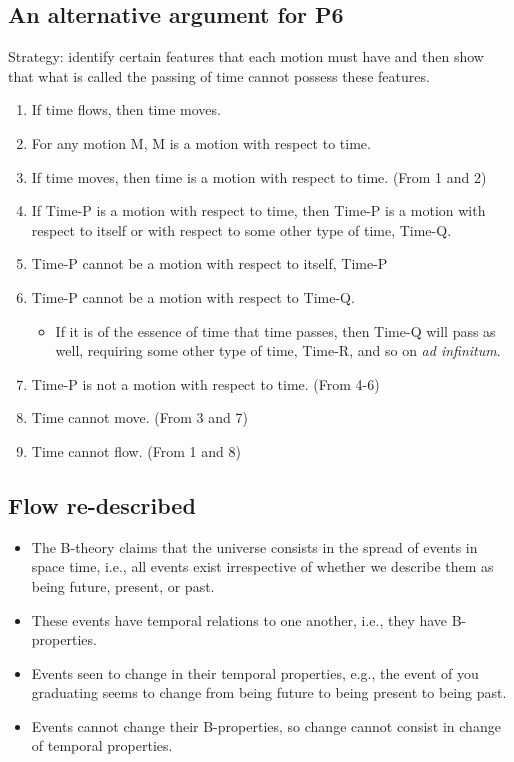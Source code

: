 \documentclass[oneside, 11]{article}
\begin{document}
\subsection*{An alternative argument for P6}

\noindent Strategy: identify certain features that each motion must have and then show that what is called the passing of time cannot possess these features. 

\begin{enumerate} 
\item If time flows, then time moves. 
\item For any motion M, M is a motion with respect to time.
\item If time moves, then time is a motion with respect to time. (From 1 and 2) 
\item If Time-P is a motion with respect to time, then Time-P is a motion with respect to itself or with respect to some other type of time, Time-Q.  
\item Time-P cannot be a motion with respect to itself, Time-P
\item Time-P cannot be a motion with respect to Time-Q. 
\begin{itemize}
\item If it is of the essence of time that time passes, then Time-Q will pass as well, requiring some other type of time, Time-R, and so on \emph{ad infinitum}. 
\end{itemize}
\item Time-P is not a motion with respect to time. (From 4-6)
\item Time cannot move. (From 3 and 7) 
\item Time cannot flow. (From 1 and 8)
\end{enumerate}

\subsection*{Flow re-described}


\begin{itemize}
\item The B-theory claims that the universe consists in the spread of events in space time, i.e., all events exist irrespective of whether we describe them as being future, present, or past.  
\item These events have temporal relations to one another, i.e., they have B-properties. 
\item Events seen to change in their temporal properties, e.g., the event of you graduating seems to change from being future to being present to being past. 
\item Events cannot change their B-properties, so change cannot consist in change of temporal properties.  
\end{itemize}
\end{document}
